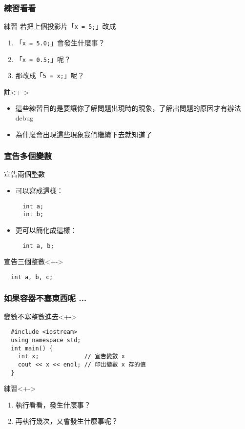 \documentclass[utf8]{beamer}
\begin{document}
\begin{CJK}{UTF8}{bkai}
\begin{frame}
  \frametitle{練習看看}
  \begin{block}{練習}
    若把上個投影片「\lstinline{x = 5;}」改成
    \begin{enumerate}[<+->]
    \item 「\lstinline{x = 5.0;}」會發生什麼事？
    \item 「\lstinline{x = 0.5;}」呢？
    \item 那改成「\lstinline{5 = x;}」呢？
    \end{enumerate}
  \end{block}
  \begin{exampleblock}{註}<+->
    \begin{itemize}
      \item 這些練習目的是要讓你了解\alert{問題出現時}的現象，了解出問題的原因才有辦法 debug
      \item<+-> 為什麼會出現這些現象我們繼續下去就知道了
    \end{itemize}
  \end{exampleblock}
\end{frame}

\begin{frame}[fragile]
  \frametitle{宣告多個變數}
  \begin{exampleblock}{宣告兩個整數}
    \begin{itemize}[<+->]
    \item 可以寫成這樣：
      \begin{lstlisting}
  int a;
  int b;
      \end{lstlisting}
    \item 更可以簡化成這樣：
      \begin{lstlisting}
  int a, b;
      \end{lstlisting}
    \end{itemize}
  \end{exampleblock}
  \begin{exampleblock}{宣告三個整數}<+->
    \begin{lstlisting}
  int a, b, c;
    \end{lstlisting}
  \end{exampleblock}
\end{frame}

\begin{frame}[fragile]
  \frametitle{如果容器不塞東西呢 ...}
  \begin{block}{變數不塞整數進去}<+->
    \begin{lstlisting}
  #include <iostream>
  using namespace std;
  int main() {
    int x;             // 宣告變數 x
    cout << x << endl; // 印出變數 x 存的值
  }
    \end{lstlisting}
  \end{block}
  \begin{exampleblock}{練習}<+->
    \begin{enumerate}
    \item 執行看看，發生什麼事？
    \item<+-> 再執行幾次，又會發生什麼事呢？
    \end{enumerate}
  \end{exampleblock}
\end{frame}


\end{CJK}
\end{document}
